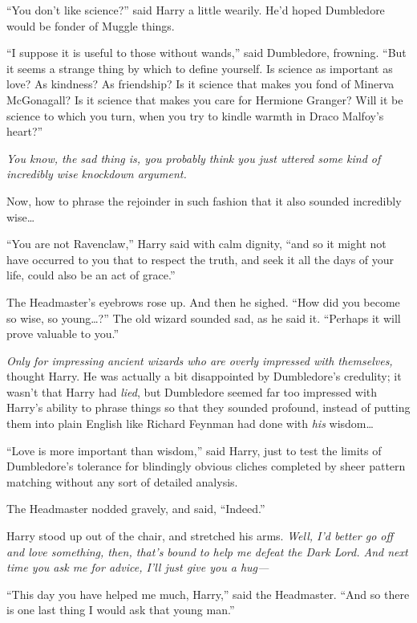 ``You don't like science?'' said Harry a little wearily. He'd hoped
Dumbledore would be fonder of Muggle things.

``I suppose it is useful to those without wands,'' said Dumbledore,
frowning. ``But it seems a strange thing by which to define yourself. Is
science as important as love? As kindness? As friendship? Is it science
that makes you fond of Minerva McGonagall? Is it science that makes you
care for Hermione Granger? Will it be science to which you turn, when
you try to kindle warmth in Draco Malfoy's heart?''

\emph{You know, the sad thing is, you probably think you just uttered
some kind of incredibly wise knockdown argument.}

Now, how to phrase the rejoinder in such fashion that it also sounded
incredibly wise\ldots{}

``You are not Ravenclaw,'' Harry said with calm dignity, ``and so it
might not have occurred to you that to respect the truth, and seek it
all the days of your life, could also be an act of grace.''

The Headmaster's eyebrows rose up. And then he sighed. ``How did you
become so wise, so young\ldots{}?'' The old wizard sounded sad, as he
said it. ``Perhaps it will prove valuable to you.''

\emph{Only for impressing ancient wizards who are overly impressed with
themselves,} thought Harry. He was actually a bit disappointed by
Dumbledore's credulity; it wasn't that Harry had \emph{lied}, but
Dumbledore seemed far too impressed with Harry's ability to phrase
things so that they sounded profound, instead of putting them into plain
English like Richard Feynman had done with \emph{his} wisdom\ldots{}

``Love is more important than wisdom,'' said Harry, just to test the
limits of Dumbledore's tolerance for blindingly obvious cliches
completed by sheer pattern matching without any sort of detailed
analysis.

The Headmaster nodded gravely, and said, ``Indeed.''

Harry stood up out of the chair, and stretched his arms. \emph{Well, I'd
better go off and love something, then, that's bound to help me defeat
the Dark Lord. And next time you ask me for advice, I'll just give you a
hug---}

``This day you have helped me much, Harry,'' said the Headmaster. ``And
so there is one last thing I would ask that young man.''

